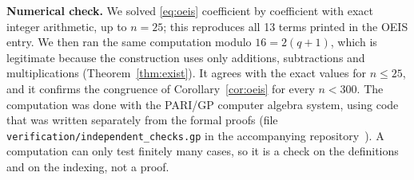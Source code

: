 \documentclass[11pt,a4paper]{article}
\theoremstyle{definition}
\theoremstyle{remark}
\newcommand{\para}[1]{\par\medskip\noindent\textbf{#1}\enspace}
\begin{document}
\para{Numerical check.}
We solved \eqref{eq:oeis} coefficient by coefficient with exact integer arithmetic, up to $n=25$; this
reproduces all 13 terms printed in the OEIS entry. We then ran the same computation
modulo $16=2(q+1)$, which is legitimate because the construction uses only additions,
subtractions and multiplications (Theorem~\ref{thm:exist}). It agrees with the exact values for $n\le25$, and it confirms
the congruence of Corollary~\ref{cor:oeis} for every $n<300$.
The computation was done with the PARI/GP computer algebra system, using code that was written separately from the
formal proofs (file \texttt{verification/independent\_checks.gp} in the accompanying repository~\cite{repo}).
A computation can only test finitely many cases, so it is a check on the definitions and on the indexing, not a proof.
\end{document}
